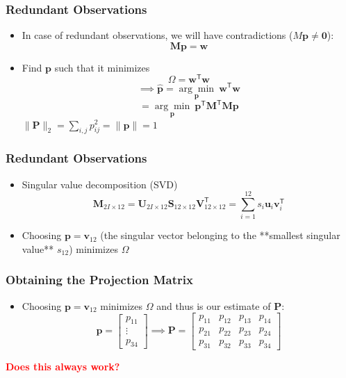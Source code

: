 \begin{frame}
    \frametitle{Redundant Observations}
    \begin{itemize}
        \item In case of redundant observations, we will have contradictions ($M\mathbf{p} \neq \mathbf{0}$):
        \[
            \mathbf{M} \mathbf{p} = \mathbf{w}
        \]
        \item Find $\mathbf{p}$ such that it minimizes
        \[
            \Omega = \mathbf{w}^\mathsf{T} \mathbf{w}
        \]
        \[
            \implies \mathbf{\hat{p}} = \underset{\mathbf{p}}{\arg\min} \ \mathbf{w}^\mathsf{T} \mathbf{w}
        \]
        \[
            = \underset{\mathbf{p}}{\arg\min} \ \mathbf{p}^\mathsf{T} \mathbf{M}^\mathsf{T} \mathbf{M} \mathbf{p}
        \]
         $\lVert\mathbf{P}\rVert_2 = \sum_{i,j} p_{ij}^2 = \lVert\mathbf{p}\rVert = 1$
    \end{itemize}
\end{frame}


\begin{frame}
    \frametitle{Redundant Observations}
    \begin{itemize}
        \item Singular value decomposition (SVD)
        \[
            \mathbf{M}_{2I \times 12} = \mathbf{U}_{2I \times 12} \mathbf{S}_{12 \times 12} \mathbf{V}_{12 \times 12}^\mathsf{T} = \sum_{i=1}^{12} s_i \mathbf{u}_i \mathbf{v}_i^\mathsf{T}
        \]
        \item Choosing $\mathbf{p} = \mathbf{v}_{12}$ (the singular vector belonging to the **smallest singular value** $s_{12}$) minimizes $\Omega$
    \end{itemize}
\end{frame}

\begin{frame}
    \frametitle{Obtaining the Projection Matrix}
    \begin{itemize}
        \item Choosing $\mathbf{p} = \mathbf{v}_{12}$ minimizes $\Omega$ and thus is our estimate of $\mathbf{P}$:
        \[
            \mathbf{p} = \begin{bmatrix}
            p_{11} \\
            \vdots \\
            p_{34}
            \end{bmatrix}
            \implies
            \mathbf{P} = \begin{bmatrix}
            p_{11} & p_{12} & p_{13} & p_{14} \\
            p_{21} & p_{22} & p_{23} & p_{24} \\
            p_{31} & p_{32} & p_{33} & p_{34}
            \end{bmatrix}
        \]
    \end{itemize}
    \vspace{1cm}
    \centering
    \textcolor{red}{\bfseries Does this always work?}
\end{frame}

